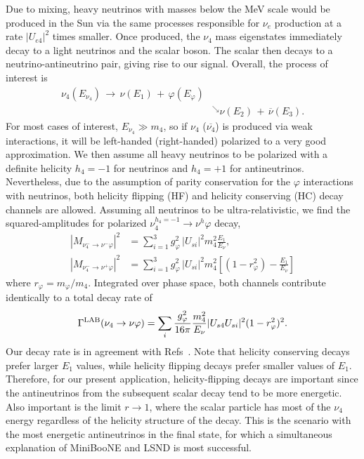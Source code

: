\documentclass[
reprint,
superscriptaddress,
showpacs,
preprintnumbers,
nofootinbib,
nobibnotes,
amsmath,
amssymb, 
aps,
prd,
floatfix
]{revtex4-1}
\renewcommand{\phi}{\varphi}
\begin{document}
Due to mixing, heavy neutrinos with masses below the MeV scale would be produced in the Sun via the same processes responsible for $\nu_e$ production at a rate $|U_{e4}|^2$ times smaller. Once produced, the $\nu_4$ mass eigenstates immediately decay to a light neutrinos and the scalar boson. The scalar then decays to a neutrino-antineutrino pair, giving rise to our signal. Overall, the process of interest is
\begin{align}
    \nu_4 (E_{\nu_4}) \,\to\, \nu(E_1) \,+\, \phi(E_\phi)&
    \\\nonumber
    &^\searrow \nu (E_2) \,+\,  \overline{\nu} (E_3).
\end{align}
%
For most cases of interest, $E_{\nu_4} \gg m_4$, so if $\nu_4$ ($\overline{\nu_4}$) is produced via weak interactions, it will be left-handed (right-handed) polarized to a very good approximation. We then assume all heavy neutrinos to be polarized with a definite helicity $h_4=-1$ for neutrinos and $h_4=+1$ for antineutrinos. Nevertheless, due to the assumption of parity conservation for the $\phi$ interactions with neutrinos, both helicity flipping (HF) and helicity conserving (HC) decay channels are allowed. Assuming all neutrinos to be ultra-relativistic, we find the squared-amplitudes for polarized $\nu_4^{h_4=-1} \to \nu^{h} \phi$ decay,
%
\begin{align}
\left|M_{\nu_4^-\to \nu^-\phi}\right|^2 &= \sum_{i=1}^3 g_\phi^2 \,|U_{si}|^2  m_4^2 \frac{E_1}{E_\nu},
\\
\left|M_{\nu_4^-\to \nu^+\phi}\right|^2 &= \sum_{i=1}^3 g_\phi^2 \,|U_{si}|^2 m_4^2  \left[(1-r_\phi^2)-\frac{E_1}{E_\nu}\right]
\end{align}
where $r_\phi = m_\phi/m_4$. Integrated over phase space, both channels contribute identically to a total decay rate of
\begin{equation}\label{eq:nu4rate}
    \Gamma^{\rm LAB} (\nu_4 \to \nu \phi) = \sum_{i} \frac{g_\phi^2}{16\pi} \frac{m_4^2}{E_\nu} |U_{s4}U_{s i}|^2 (1-r_\phi^2)^2.
\end{equation}
Our decay rate is in agreement with Refs~\cite{Kim:1990km,Dentler:2019dhz}. Note that helicity conserving decays prefer larger $E_1$ values, while helicity flipping decays prefer smaller values of $E_1$. Therefore, for our present application, helicity-flipping decays are important since the antineutrinos from the subsequent scalar decay tend to be more energetic. Also important is the limit $r\to1$, where the scalar particle has most of the $\nu_4$ energy regardless of the helicity structure of the decay. This is the scenario with the most energetic antineutrinos in the final state, for which a simultaneous explanation of MiniBooNE and LSND is most successful.
\end{document}
